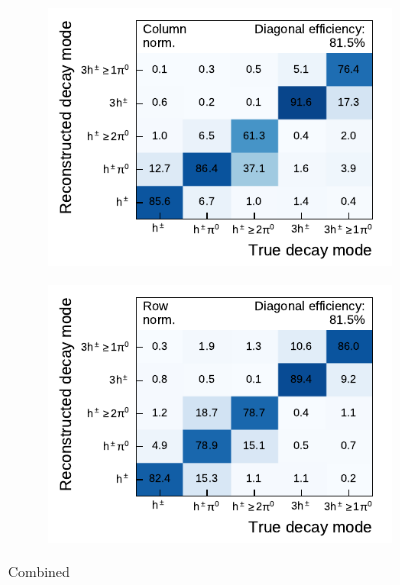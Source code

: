 \begin{figure}[!ht]
  \begin{subfigure}{0.48\textwidth}
    \centering
    \includegraphics{./figures/decay_mode_classification/combined_sub_e_moments_shots_conv_ptcut_1_5/mig_mat.pdf}
  \end{subfigure}\hfill
  \begin{subfigure}{0.48\textwidth}
    \centering
    \includegraphics{./figures/decay_mode_classification/combined_sub_e_moments_shots_conv_ptcut_1_5/comp_mat.pdf}
  \end{subfigure}
  \caption{Combined}
  \label{fig:decay_mode_combined}
\end{figure}

